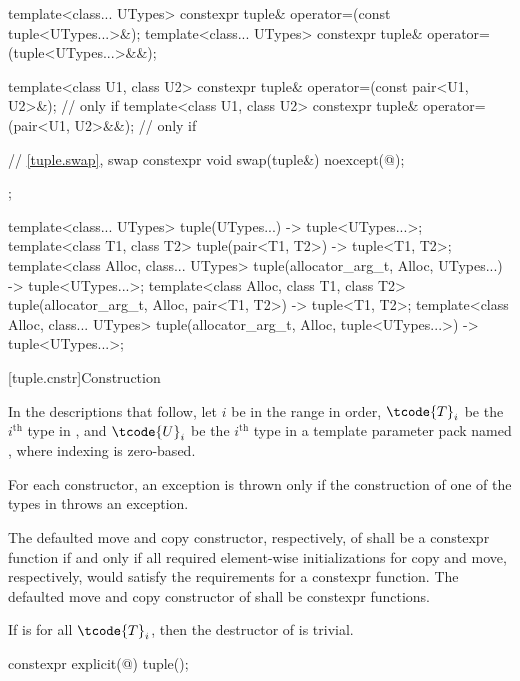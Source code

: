 \begin{codeblock}
{{    template<class... UTypes>
      constexpr tuple& operator=(const tuple<UTypes...>&);
    template<class... UTypes>
      constexpr tuple& operator=(tuple<UTypes...>&&);

    template<class U1, class U2>
      constexpr tuple& operator=(const pair<U1, U2>&);            // only if 
    template<class U1, class U2>
      constexpr tuple& operator=(pair<U1, U2>&&);                 // only if 

    // \ref{tuple.swap},  swap
    constexpr void swap(tuple&) noexcept(@\seebelow@);
  };

  template<class... UTypes>
    tuple(UTypes...) -> tuple<UTypes...>;
  template<class T1, class T2>
    tuple(pair<T1, T2>) -> tuple<T1, T2>;
  template<class Alloc, class... UTypes>
    tuple(allocator_arg_t, Alloc, UTypes...) -> tuple<UTypes...>;
  template<class Alloc, class T1, class T2>
    tuple(allocator_arg_t, Alloc, pair<T1, T2>) -> tuple<T1, T2>;
  template<class Alloc, class... UTypes>
    tuple(allocator_arg_t, Alloc, tuple<UTypes...>) -> tuple<UTypes...>;
}
\end{codeblock}

[tuple.cnstr]{Construction}

\pnum
In the descriptions that follow, let $i$ be in the range
 in order, $\tcode{T}_i$
be the $i^\text{th}$ type in , and
$\tcode{U}_i$ be the $i^\text{th}$ type in a template parameter pack named , where indexing
is zero-based.

\pnum
For each  constructor, an exception is thrown only if the construction of
one of the types in  throws an exception.

\pnum
The defaulted move and copy constructor, respectively, of
 shall be a constexpr function if and only if all
required element-wise initializations for copy and move, respectively,
would satisfy the requirements for a constexpr function. The
defaulted move and copy constructor of  shall be
constexpr functions.

\pnum
If  is  for all $\tcode{T}_i$,
then the destructor of  is trivial.

%
\begin{itemdecl}
constexpr explicit(@\seebelow@) tuple();
\end{itemdecl}


